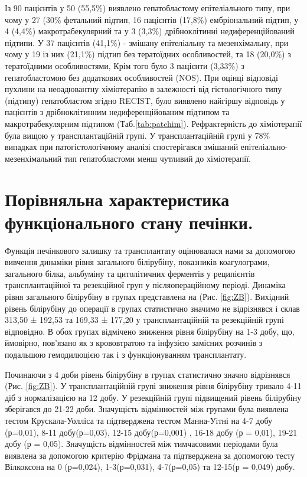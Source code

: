 Із 90 пацієнтів у 50 (55,5\%) виявлено гепатобластому епітеліального типу, при чому у 27 (30\% фетальний підтип, 16 пацієнтів (17,8\%) ембріональний підтип, у 4 (4,4\%) макротрабекулярний та у 3 (3,3\%) дрібноклітинні недиференційований підтипи. У 37 пацієнтів (41,1\%) - змішану епітеліальну та мезенхімальну, при чому у 19 із них	(21,1\%) підтип без тератоїдних особливостей, та 18	(20,0\%) з тератоїдними  особливостями, Крім того було 3 пацієнти	(3,33\%) з гепатобластомою без додаткових особливостей (NOS). При оцінці відповіді пухлини на неоадювантну хіміотерапію в залежності від гістологічного типу (підтипу) гепатобластом згідно RECIST, було виявлено найгіршу відповідь у пацієнтів з дрібноклітинним недиференційованим підтипом та макротрабекулярним підтипом (Таб.\ref{tab:patchim}).
Рефрактерність до хіміотерапії була вищою у трансплантаційній групі. У трансплантаційній групі у 78\% випадках при патогістологічному аналізі спостерігався змішаний епітеліально-мезенхімальний тип гепатобластоми менш чутливий до хіміотерапії.

\section{Порівняльна характеристика функціонального стану печінки.}
Функція печінкового залишку та трансплантату оцінювалася нами за допомогою вивчення динаміки рівня загального білірубіну, показників коагулограми, загального білка, альбуміну та цитолітичних ферментів у реципієнтів трансплантаційної та резекційної груп у післяопераційному періоді.
Динаміка рівня загального білірубіну в групах представлена на (Рис. \ref{fig:ZB}). Вихідний рівень білірубіну до операції в групах статистично значимо не відрізнявся і склав 313,50 ± 192,53 та 169,33 ± 177,20 у трансплантаційній та резекційній групі відповідно. В обох групах відмічено зниження рівня білірубіну на 1-3 добу, що, ймовірно, пов'язано як з крововтратою та інфузією замісних розчинів з подальшою гемодилюцією так і з функціонуванням трансплантату.

Починаючи з 4 доби рівень білірубіну в групах статистично значно відрізнявся (Рис. \ref{fig:ZB}). У трансплантаційній групі зниження рівня білірубіну тривало 4-11 діб з нормалізацією на 12 добу. У резекційній групі підвищений рівень білірубіну зберігався до 21-22 доби. Значущість відмінностей між групами була виявлена тестом Крускала-Уолліса та підтверджена тестом Манна-Уітні на 4-7 добу (р=0,01), 8-11 добу(р=0,03), 12-15 добу(р=0,001) , 16-18 добу (р = 0,01), 19-21 добу (р = 0,05). Значущість відмінностей між тимчасовими періодами була виявлена за допомогою критерію Фрідмана та підтверджена за допомогою тесту Вілкоксона на 0 (р=0,024), 1-3(р=0,031), 4-7(р=0,05) та 12-15(р = 0,049) добу.

